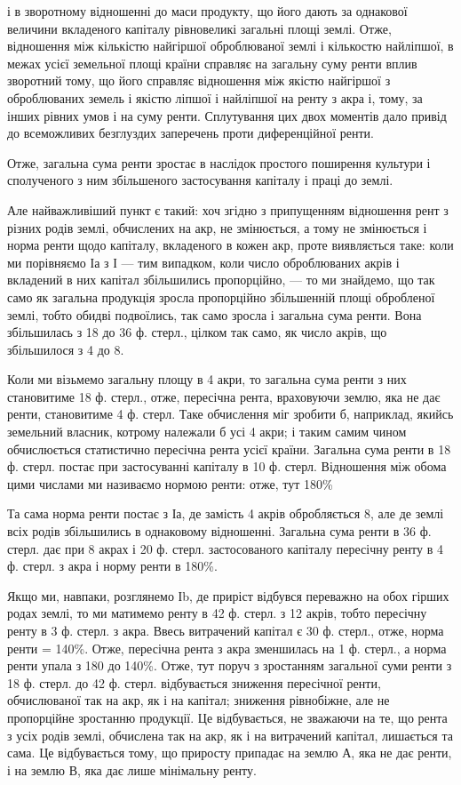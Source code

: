 \parcont{}  %
і в зворотному відношенні до маси продукту, що його дають за однакової величини
вкладеного капіталу рівновеликі загальні площі землі. Отже, відношення між
кількістю найгіршої оброблюваної землі і кількостю найліпшої, в межах усієї
земельної площі країни справляє на загальну суму ренти вплив зворотний
тому, що його справляє відношення між якістю найгіршої з оброблюваних земель
і якістю ліпшої і найліпшої на ренту з акра і, тому, за інших рівних
умов і на суму ренти. Сплутування цих двох моментів дало привід до всеможливих
безглуздих заперечень проти диференційної ренти.

Отже, загальна сума ренти зростає в наслідок простого поширення культури
і сполученого з ним збільшеного застосування капіталу і праці до землі.

Але найважливіший пункт є такий: хоч згідно з припущенням відношення
рент з різних родів землі, обчислених на акр, не змінюється, а тому
не змінюється і норма ренти щодо капіталу, вкладеного в кожен акр, проте
виявляється таке: коли ми порівняємо Іа з І — тим випадком, коли число оброблюваних
акрів і вкладений в них капітал збільшились пропорційно, — то ми знайдемо,
що так само як загальна продукція зросла пропорційно збільшенній площі
обробленої землі, тобто обидві подвоїлись, так само зросла і загальна сума ренти.
Вона збільшилась з 18 до 36 ф. стерл., цілком так само, як число акрів, що
збільшилося з 4 до 8.

Коли ми візьмемо загальну площу в 4 акри, то загальна сума ренти з них
становитиме 18 ф. стерл., отже, пересічна рента, враховуючи землю, яка не дає
ренти, становитиме 4  ф. стерл. Таке обчислення міг зробити б, наприклад,
якийсь земельний власник, котрому належали б усі 4 акри; і таким самим
чином обчислюється статистично пересічна рента усієї країни. Загальна сума
ренти в 18 ф. стерл. постає при застосуванні капіталу в 10 ф. стерл.
Відношення між обома цими числами ми називаємо нормою ренти: отже, тут
180\%

Та сама норма ренти постає з Іа, де замість 4 акрів обробляється 8,
але де землі всіх родів збільшились в однаковому відношенні. Загальна сума
ренти в 36 ф. стерл. дає при 8 акрах і 20 ф. стерл. застосованого капіталу
пересічну ренту в 4  ф. стерл. з акра і норму ренти в 180\%.

Якщо ми, навпаки, розглянемо Іb, де приріст відбувся переважно на обох
гірших родах землі, то ми матимемо ренту в 42 ф. стерл. з 12 акрів, тобто
пересічну ренту в 3  ф. стерл. з акра. Ввесь витрачений капітал є 30 ф. стерл.,
отже, норма ренти = 140\%. Отже, пересічна рента з акра зменшилась на 1 ф.
стерл., а норма ренти упала з 180 до 140\%. Отже, тут поруч з зростанням
загальної суми ренти з 18 ф. стерл. до 42 ф. стерл. відбувається зниження
пересічної ренти, обчислюваної так на акр, як і на капітал; зниження рівнобіжне,
але не пропорційне зростанню продукції. Це відбувається, не зважаючи на те,
що рента з усіх родів землі, обчислена так на акр, як і на витрачений капітал,
лишається та сама. Це відбувається тому, що  приросту припадає на
землю А, яка не дає ренти, і на землю В, яка дає лише мінімальну ренту.

